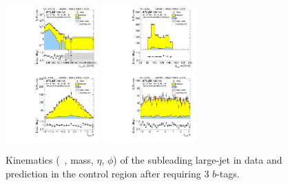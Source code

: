 \begin{figure}[htbp!]
\begin{center}
\includegraphics[width=0.32\textwidth,angle=-90]{figures/boosted/Control/b77_ThreeTag_Control_sublHCand_Pt_m_1.pdf}
\includegraphics[width=0.32\textwidth,angle=-90]{figures/boosted/Control/b77_ThreeTag_Control_sublHCand_Mass_s.pdf}\\
\includegraphics[width=0.32\textwidth,angle=-90]{figures/boosted/Control/b77_ThreeTag_Control_sublHCand_Eta.pdf}
\includegraphics[width=0.32\textwidth,angle=-90]{figures/boosted/Control/b77_ThreeTag_Control_sublHCand_Phi.pdf}
  \caption{Kinematics (\pt~, mass, $\eta$, $\phi$) of the subleading large-\R jet in data and prediction in the control region after requiring 3 $b$-tags. }
  \label{fig:boosted-3b-control-ak10-subl}
\end{center}
\end{figure}

